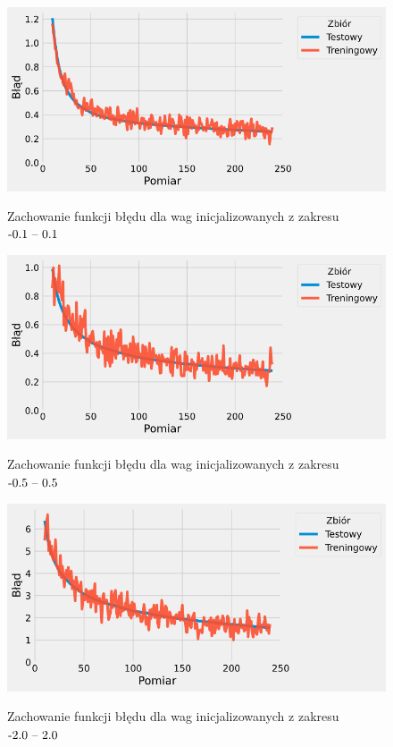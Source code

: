 \documentclass{article}
\begin{document}
\begin{figure}[H]
	\centering
	\caption{Zachowanie funkcji błędu dla wag inicjalizowanych z zakresu \($-0.1 -- 0.1$\)}
	\includegraphics[width=\textwidth]{w_err_1.png}
	\label{fig:res34}
\end{figure}
\begin{figure}[H]
	\centering
	\caption{Zachowanie funkcji błędu dla wag inicjalizowanych z zakresu \($-0.5 -- 0.5$\)}
	\includegraphics[width=\textwidth]{w_err_5.png}
	\label{fig:res35}
\end{figure}
\begin{figure}[H]
	\centering
	\caption{Zachowanie funkcji błędu dla wag inicjalizowanych z zakresu \($-2.0 -- 2.0$\)}
	\includegraphics[width=\textwidth]{w_err_2.png}
	\label{fig:res36}
\end{figure}
\end{document}
